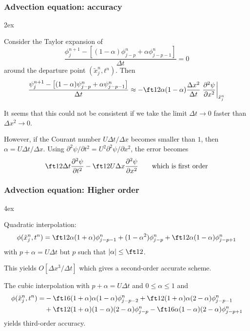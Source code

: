 \documentclass[aspectratio=149,9pt]{beamer}
\begin{document}
%
\begin{frame}
	\frametitle{Advection equation: accuracy}
	\begin{myitemize}{2ex}
		\item Consider the Taylor expansion of
			\begin{equation*}
				\frac{ \phi_j^{n+1} - \left[ (1-\alpha) \phi^n_{j-p} + \alpha \phi_{j-p-1}^n \right]} {\Delta t} = 0
			\end{equation*}
			around the departure point $(\tilde x_j^n, t^n)$. Then
			\begin{equation*}
				\frac{ \psi_j^{n+1} - \left[ (1-\alpha) \psi^n_{j-p} + \alpha \psi_{j-p-1}^n\right]}{\Delta t}
					\approx - \ft12 \alpha (1-\alpha) \frac{\Delta x^2}{\Delta t} \left. \frac{\partial^2 \psi}{\partial x^2} \right|_{\tilde x_j^n}
			\end{equation*}
		\item It seems that this could not be consistent if we take the limit $\Delta t \rightarrow 0$ faster than $\Delta x^2\rightarrow 0$.
\pause
		\item However, if the Courant number $U \Delta t / \Delta x$ becomes smaller than $1$, then $\alpha = U \Delta t / \Delta x$. Using $\partial^2 \psi / \partial t^2 = U^2 \partial^2 \psi / \partial x^2$, the error becomes
			\begin{equation*}
				\ft12 \Delta t \frac{\partial^2 \psi}{\partial t^2} - \ft12 U \Delta x \frac{\partial^2 \psi}{\partial x^2} \qquad \text{which is first order}
			\end{equation*}
	\end{myitemize}
\end{frame}
%
%
\begin{frame}
	\frametitle{Advection equation: Higher order}
	\begin{myitemize}{4ex}
		\item Quadratic interpolation:
			\begin{equation*}
				\phi (\tilde x_j^n, t^n) = \ft12 \alpha (1+\alpha) \phi_{j-p-1}^n + (1 - \alpha^2) \phi_{j-p}^n + \ft12 \alpha (1-\alpha) \phi_{j-p+1}^n
			\end{equation*}
			with $p + \alpha = U \Delta t$ but $p$ such that $| \alpha | \le \ft12$.
			\par\vspace*{2ex}
			This yields $O [ \Delta x^3 / \Delta t]$ which gives a second-order accurate scheme.
		\item The cubic interpolation with $p + \alpha = U \Delta t$ and $0\leq\alpha\leq1$ and
			\begin{align*}
				\phi ( \tilde x_j^n, t^n ) =& - \ft16 (1+\alpha)\alpha(1-\alpha) \phi^n_{j-p-2} + \ft12 (1+\alpha)\alpha(2-\alpha) \phi_{j-p-1}^n \\
					& + \ft12 (1+\alpha)(1-\alpha)(2-\alpha) \phi_{j-p}^n - \ft16 \alpha(1-\alpha)(2-\alpha) \phi_{j-p+1}^n
			\end{align*}
			yields third-order accuracy.
	\end{myitemize}
\end{frame}
\end{document}
